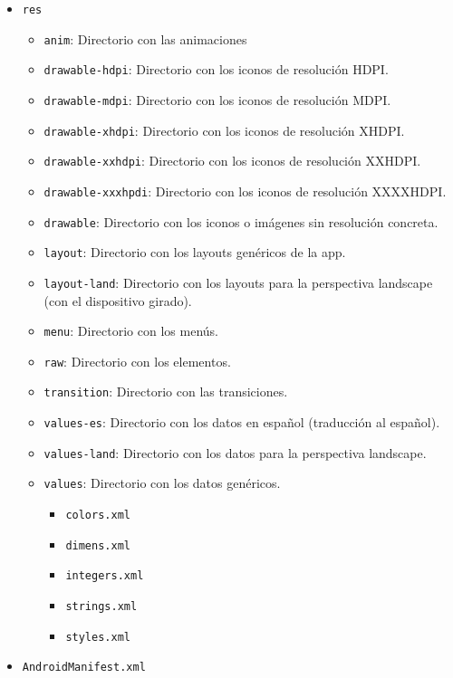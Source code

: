 \begin{itemize}
\begin{itemize}
  \item \texttt{res}
    \begin{itemize}
    \item \texttt{anim}: Directorio con las animaciones
    \item \texttt{drawable-hdpi}: Directorio con los iconos de resolución HDPI.
    \item \texttt{drawable-mdpi}: Directorio con los iconos de resolución MDPI.
    \item \texttt{drawable-xhdpi}: Directorio con los iconos de resolución
      XHDPI.
    \item \texttt{drawable-xxhdpi}: Directorio con los iconos de resolución
      XXHDPI.
    \item \texttt{drawable-xxxhpdi}: Directorio con los iconos de resolución
      XXXXHDPI.
    \item \texttt{drawable}: Directorio con los iconos o imágenes sin
      resolución concreta.
    \item \texttt{layout}: Directorio con los layouts genéricos de la app.
    \item \texttt{layout-land}: Directorio con los layouts para la perspectiva
      landscape (con el dispositivo girado).
    \item \texttt{menu}: Directorio con los menús.
    \item \texttt{raw}: Directorio con los elementos.
    \item \texttt{transition}: Directorio con las transiciones.
    \item \texttt{values-es}: Directorio con los datos en español (traducción
      al español).
    \item \texttt{values-land}: Directorio con los datos para la perspectiva
      landscape.
    \item \texttt{values}: Directorio con los datos genéricos.
      \begin{itemize}
      \item \texttt{colors.xml}
      \item \texttt{dimens.xml}
      \item \texttt{integers.xml}
      \item \texttt{strings.xml}
      \item \texttt{styles.xml}
      \end{itemize}
    \end{itemize}
  \item \texttt{AndroidManifest.xml}
  \end{itemize}
\end{itemize}

